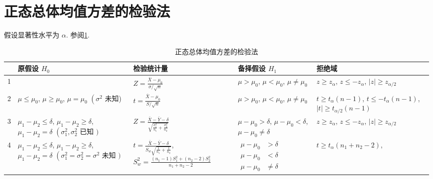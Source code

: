 \section{正态总体均值方差的检验法}

假设显著性水平为 $\alpha$. 参阅\ref{tab:NormalDistroHypothesisTesting}.


\begin{table}[]
    \caption{正态总体均值方差的检验法}
    \label{tab:NormalDistroHypothesisTesting}
    \begin{tabularx}{1\textwidth}{
         c
        | >{\raggedright\arraybackslash}X
        | >{\raggedright\arraybackslash}X 
        | >{\raggedright\arraybackslash}X 
        | >{\raggedright\arraybackslash}X }
         \hline
     & 原假设 $H_{0}$ & 检验统计量 & 备择假设 $H_{1}$ & 拒绝域 \\ \hline
    1 &{$ \mu \leq \mu_{0} $,
    $ \mu \geq \mu_{0} $,
    $ \mu=\mu_{0} $
    $ \left(\sigma^{2}\right. $ 已知 $ ) $
     } & $Z=\frac{\bar{X}-\mu_{0}}{\sigma / \sqrt{n}}$ & { $ \mu>\mu_{0} $,
        $ \mu<\mu_{0} $,
        $ \mu \neq \mu_{0} $ }& {$ z \geq z_{\alpha} $,
        $ z \leq-z_{\alpha} $,
        $ |z| \geq z_{\alpha / 2} $ }\\ \hline
    2 & $ \mu \leq \mu_{0} $,
    $ \mu \geq \mu_{0} $,
    $ \mu=\mu_{0} $
    $ \left(\sigma^{2}\right. $ 未知) & $t=\frac{\bar{X}-\mu_{0}}{S / \sqrt{n}}$ & $ \mu>\mu_{0} $,
    $ \mu<\mu_{0} $,
    $ \mu \neq \mu_{0} $ & $ t \geq t_{\alpha}(n-1) $,
    $ t \leq-t_{\alpha}(n-1) $,
    $ |t| \geq t_{\alpha / 2}(n-1) $ \\ \hline
    3 & $ \mu_{1}-\mu_{2} \leq \delta $,
    $ \mu_{1}-\mu_{2} \geq \delta $,
    $ \mu_{1}-\mu_{2}=\delta $
    $ \left(\sigma_{1}^{2}, \sigma_{2}^{2}\right. $ 已知 $ ) $ & $ Z=\frac{\bar{X}-\bar{Y}-\delta}{\sqrt{\frac{\sigma_{1}^{2}}{n_{1}}+\frac{\sigma_{2}^{2}}{n_{2}}}} $ & $ \mu-\mu_{0}>\delta $,
    $ \mu-\mu_{0}<\delta $,
    $ \mu-\mu_{0} \neq \delta $ & $ z \geq z_{\alpha} $,
    $ z \leq-z_{\alpha} $,
    $ |z| \geq z_{\alpha / 2} $ \\ \hline
    4 & $ \mu_{1}-\mu_{2} \leq \delta $,
    $ \mu_{1}-\mu_{2} \geq \delta $,
    $ \mu_{1}-\mu_{2}=\delta $
    $ \left(\sigma_{1}^{2}=\sigma_{2}^{2}=\sigma^{2}\right. $ 未知 $ ) $ & $ t=\frac{\bar{X}-\bar{Y}-\delta}{S_{w} \sqrt{\frac{1}{n_{1}}+\frac{1}{n_{2}}}} $,
    $ S_{w}^{2}=\frac{\left(n_{1}-1\right) S_{1}^{2}+\left(n_{2}-2\right) S_{2}^{2}}{n_{1}+n_{2}-2} $ & $ \begin{aligned} \mu-\mu_{0} &>\delta \\ \mu-\mu_{0} &<\delta \\ \mu-\mu_{0} & \neq \delta \end{aligned} $ & $ t \geq t_{\alpha}\left(n_{1}+n_{2}-2\right) $,

\end{tabularx}
\end{table}
